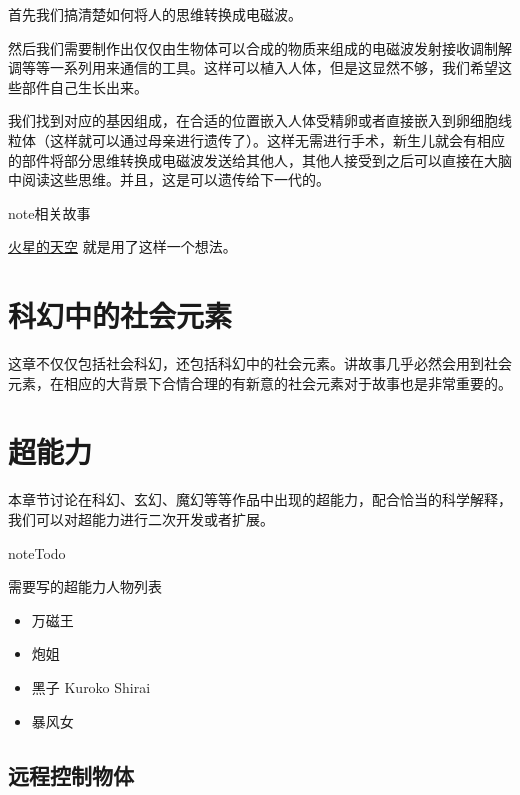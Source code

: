\documentclass[letterpaper,10pt,english]{sphinxmanual}
\begin{document}
首先我们搞清楚如何将人的思维转换成电磁波。

然后我们需要制作出仅仅由生物体可以合成的物质来组成的电磁波发射接收调制解调等等一系列用来通信的工具。这样可以植入人体，但是这显然不够，我们希望这些部件自己生长出来。

我们找到对应的基因组成，在合适的位置嵌入人体受精卵或者直接嵌入到卵细胞线粒体（这样就可以通过母亲进行遗传了）。这样无需进行手术，新生儿就会有相应的部件将部分思维转换成电磁波发送给其他人，其他人接受到之后可以直接在大脑中阅读这些思维。并且，这是可以遗传给下一代的。

\begin{notice}{note}{相关故事}

\href{http://multiverse.lamost.org/blog/6433}{火星的天空} 就是用了这样一个想法。
\end{notice}


\section{科幻中的社会元素}
\label{social::doc}\label{social:id1}
这章不仅仅包括社会科幻，还包括科幻中的社会元素。讲故事几乎必然会用到社会元素，在相应的大背景下合情合理的有新意的社会元素对于故事也是非常重要的。


\section{超能力}
\label{superpower::doc}\label{superpower:id1}
本章节讨论在科幻、玄幻、魔幻等等作品中出现的超能力，配合恰当的科学解释，我们可以对超能力进行二次开发或者扩展。

\begin{notice}{note}{Todo}

需要写的超能力人物列表
\begin{itemize}
\item {} 
万磁王

\item {} 
炮姐

\item {} 
黑子 Kuroko Shirai

\item {} 
暴风女

\end{itemize}
\end{notice}


\subsection{远程控制物体}
\label{superpower:id2}
\end{document}
